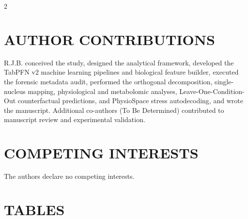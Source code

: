 \documentclass[10pt,a4paper]{article}
\begin{document}
\begin{multicols}{2}
\section*{AUTHOR CONTRIBUTIONS}
R.J.B. conceived the study, designed the analytical framework, developed the TabPFN v2 machine learning pipelines and biological feature builder, executed the forensic metadata audit, performed the orthogonal decomposition, single-nucleus mapping, physiological and metabolomic analyses, Leave-One-Condition-Out counterfactual predictions, and PhysioSpace stress autodecoding, and wrote the manuscript. Additional co-authors (To Be Determined) contributed to manuscript review and experimental validation.

\section*{COMPETING INTERESTS}
The authors declare no competing interests.




\end{multicols}

\clearpage

\section*{\textsf{TABLES}}
\end{document}
